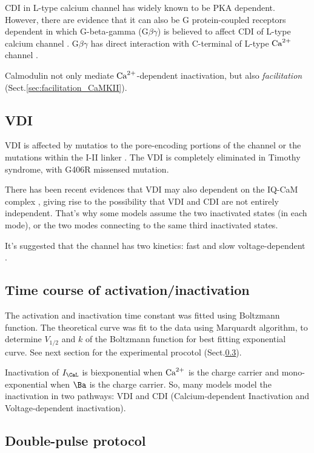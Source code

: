 CDI in L-type calcium channel has widely known to be PKA dependent. However,
there are evidence that it can also be G protein-coupled receptors dependent in
which G-beta-gamma (G$\beta\gamma$) is believed to affect CDI of L-type
calcium channel \citep{ivanina2000}. G$\beta\gamma$ has direct interaction with
C-terminal of L-type ${\text{Ca}^{2+}}$ channel \citep{qin1997}.

Calmodulin not only mediate ${\text{Ca}^{2+}}$-dependent inactivation, but also {\it
facilitation} (Sect.\ref{sec:facilitation_CaMKII}). 
  
\subsection{VDI}

VDI is affected by mutatios to the pore-encoding portions of the channel
\citep{stotz2001} or the mutations within the I-II linker \citep{splawski2004,
dafi2004}.  The VDI is completely eliminated in Timothy syndrome, with G406R
missensed mutation.

There has been recent evidences that VDI may also dependent on the IQ-CaM
complex \citep{liang2003}, giving rise to the possibility that VDI and CDI are
not entirely independent. That's why some models assume the two inactivated states
(in each mode), or the two modes connecting to the same third inactivated
states. 

It's suggested that the channel has two kinetics: fast and slow
voltage-dependent \citep{ferreira2003}. 

\subsection{Time course of activation/inactivation}
\label{sec:LCC_timecourse}


The activation and inactivation time constant was fitted using Boltzmann
function. The theoretical curve was fit to the data using Marquardt algorithm,
to determine $V_{1/2}$ and $k$ of the Boltzmann function for best fitting
exponential curve. See next section for the experimental procotol
(Sect.\ref{sec:double_pulse_protocol}).

Inactivation of $I_\CaL$ is biexponential when ${\text{Ca}^{2+}}$ is the charge carrier and
mono-exponential when $\Ba$ is the charge carrier. So, many models model the
inactivation in two pathways: VDI and CDI (Calcium-dependent Inactivation and
Voltage-dependent inactivation). 



\subsection{Double-pulse protocol}
\label{sec:double_pulse_protocol}


